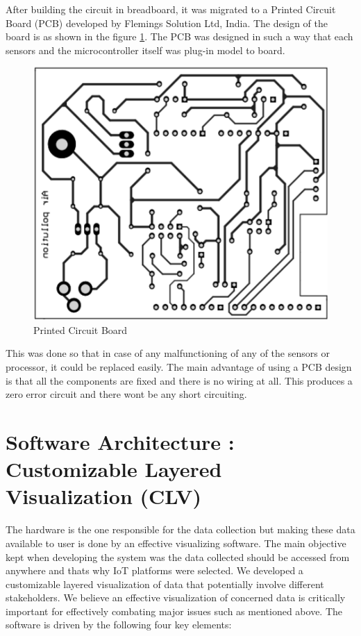 After building the circuit in breadboard, it was migrated to a Printed Circuit Board (PCB) developed by Flemings Solution Ltd, India. The design of the board is as shown in the figure \ref{pcb}. The PCB was designed in such a way that each sensors and the microcontroller itself was plug-in model to board. 

\begin{figure}[h]
  \begin{center}
  \includegraphics[scale=0.60]{./images/figure10.png}
  \end{center}
  \caption{Printed Circuit Board}
  \label{pcb}
\end{figure}

 This was done so that in case of any malfunctioning of any of the sensors or processor, it could be replaced easily. The main advantage of using a PCB design is that all the components are fixed and there is no wiring at all. This produces a zero error circuit and there wont be any short circuiting.

\section{Software Architecture : Customizable Layered Visualization (CLV)}

The hardware is the one responsible for the data collection but making these data available to user is done by an effective visualizing software. The main objective kept when developing the system was the data collected should be accessed from anywhere and thats why IoT platforms were selected. We developed a customizable layered visualization of data that potentially involve different stakeholders. We believe an effective visualization of concerned data is critically important for effectively combating major issues such as mentioned above. The software is driven by the following four key elements:

